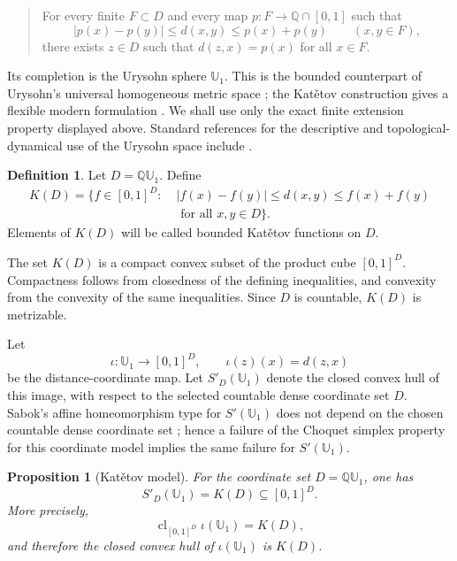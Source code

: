 \documentclass{proc-l}
\numberwithin{equation}{section}
\newtheorem{proposition}[theorem]{Proposition}
\theoremstyle{definition}
\newtheorem{definition}[theorem]{Definition}
\theoremstyle{remark}
\newcommand{\U}{\mathbb U}
\newcommand{\QU}{\mathbb Q\mathbb U}
\newcommand{\cl}{\operatorname{cl}}
\begin{document}
\begin{quote}
For every finite \(F\subset D\) and every map \(p:F\to\mathbb Q\cap[0,1]\)
such that
\[
        |p(x)-p(y)|\le d(x,y)\le p(x)+p(y)\qquad(x,y\in F),
\]
there exists \(z\in D\) such that \(d(z,x)=p(x)\) for all \(x\in F\).
\end{quote}

Its completion is the Urysohn sphere \(\U_1\).  This is the bounded counterpart
of Urysohn's universal homogeneous metric space \cite{Urysohn1927}; the
Kat\v{e}tov construction gives a flexible modern formulation
\cite{Katetov1988,Gromov2007}.  We shall use only the exact finite extension
property displayed above.  Standard references for the descriptive and
topological-dynamical use of the Urysohn space include
\cite{GaoKechris2003,Melleray2016}.

\begin{definition}
Let \(D=\QU_1\).  Define
\[
\begin{aligned}
        K(D)=\{f\in[0,1]^D:\;& |f(x)-f(y)|\le d(x,y)\le f(x)+f(y)\\
        &\text{ for all }x,y\in D\}.
\end{aligned}
\]
Elements of \(K(D)\) will be called bounded Kat\v{e}tov functions on \(D\).
\end{definition}

The set \(K(D)\) is a compact convex subset of the product cube \([0,1]^D\).
Compactness follows from closedness of the defining inequalities, and convexity
from the convexity of the same inequalities.  Since \(D\) is countable, \(K(D)\) is
metrizable.

Let
\[
        \iota:\U_1\longrightarrow[0,1]^D,
        \qquad
        \iota(z)(x)=d(z,x)
\]
be the distance-coordinate map.  Let \(S'_D(\U_1)\) denote the closed convex hull of this image, with respect to
the selected countable dense coordinate set \(D\).  Sabok's affine
homeomorphism type for \(S'(\U_1)\) does not depend on the chosen countable
dense coordinate set \cite[Proposition~5.11]{Sabok2016}; hence a failure of
the Choquet simplex property for this coordinate model implies the same failure
for \(S'(\U_1)\).

\begin{proposition}[Kat\v{e}tov model]\label{prop:urysohn-model}
For the coordinate set \(D=\QU_1\), one has
\[
        S'_D(\U_1)=K(D)\subseteq[0,1]^D.
\]
More precisely,
\[
        \cl_{[0,1]^D}\iota(\U_1)=K(D),
\]
and therefore the closed convex hull of \(\iota(\U_1)\) is \(K(D)\).
\end{proposition}
\end{document}
